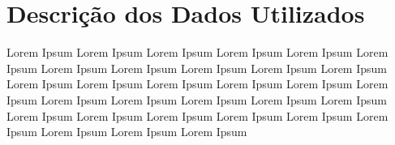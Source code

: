 
\chapter{Descrição dos Dados Utilizados}\label{base_dados}



Lorem Ipsum Lorem Ipsum Lorem Ipsum Lorem Ipsum Lorem Ipsum Lorem Ipsum Lorem Ipsum Lorem Ipsum Lorem Ipsum Lorem Ipsum Lorem Ipsum Lorem Ipsum Lorem Ipsum Lorem Ipsum Lorem Ipsum Lorem Ipsum Lorem Ipsum Lorem Ipsum Lorem Ipsum Lorem Ipsum Lorem Ipsum Lorem Ipsum Lorem Ipsum Lorem Ipsum Lorem Ipsum Lorem Ipsum Lorem Ipsum Lorem Ipsum Lorem Ipsum Lorem Ipsum Lorem Ipsum 

